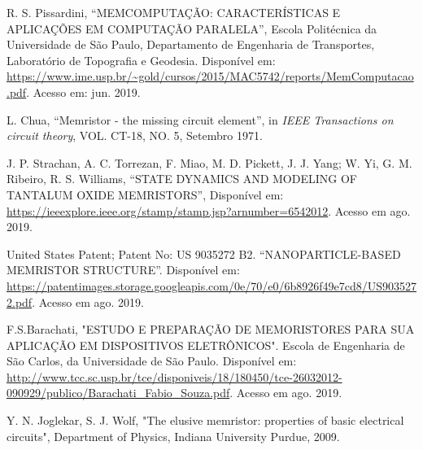 \documentclass{ceel}
\begin{document}
\begin{multicols}{2}
\begin{thebibliography}{9}
    R. S. Pissardini,
    “MEMCOMPUTAÇÃO: CARACTERÍSTICAS E APLICAÇÕES EM
COMPUTAÇÃO PARALELA”, Escola Politécnica da Universidade de São Paulo, Departamento de Engenharia de Transportes, Laboratório de Topografia e Geodesia.
 Disponível em:
 \url{https://www.ime.usp.br/~gold/cursos/2015/MAC5742/reports/MemComputacao.pdf}. Acesso em: jun. 2019.

    L. Chua,
    “Memristor - the missing circuit element”, 
    in \emph{IEEE Transactions on circuit theory}, VOL. CT-18, NO. 5, Setembro 1971.
    

    J. P. Strachan, A. C. Torrezan, F. Miao, M. D. Pickett, J. J. Yang; W. Yi, G. M. Ribeiro, R. S. Williams, “STATE DYNAMICS AND MODELING OF TANTALUM OXIDE MEMRISTORS”, Disponível em: \url{https://ieeexplore.ieee.org/stamp/stamp.jsp?arnumber=6542012}. Acesso em ago. 2019.
    
    United States Patent; Patent No: US 9035272 B2. “NANOPARTICLE-BASED MEMRISTOR STRUCTURE”. Disponível em: \url{https://patentimages.storage.googleapis.com/0e/70/e0/6b8926f49e7cd8/US9035272.pdf}. Acesso em ago. 2019.
    
   F.S.Barachati, "ESTUDO E PREPARAÇÃO DE MEMORISTORES PARA SUA APLICAÇÃO EM DISPOSITIVOS ELETRÔNICOS". Escola de Engenharia de São Carlos, da Universidade de São Paulo. Disponível em: \url{http://www.tcc.sc.usp.br/tce/disponiveis/18/180450/tce-26032012-090929/publico/Barachati_Fabio_Souza.pdf}. 
   Acesso em ago. 2019.

    Y. N. Joglekar, S. J. Wolf, "The elusive memristor: properties of basic electrical circuits", Department of Physics, Indiana University Purdue, 2009.



\end{thebibliography}
\end{multicols}
\end{document}
